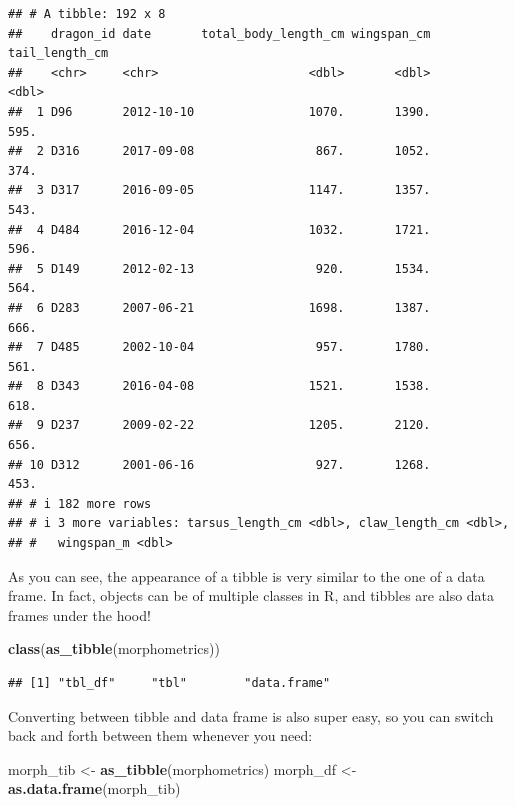 \documentclass[
]{book}
\newenvironment{Shaded}{\begin{snugshade}}{\end{snugshade}}
\newcommand{\FunctionTok}[1]{\textcolor[rgb]{0.13,0.29,0.53}{\textbf{#1}}}
\newcommand{\NormalTok}[1]{#1}
\newcommand{\OtherTok}[1]{\textcolor[rgb]{0.56,0.35,0.01}{#1}}
\begin{document}
\begin{verbatim}
## # A tibble: 192 x 8
##    dragon_id date       total_body_length_cm wingspan_cm tail_length_cm
##    <chr>     <chr>                     <dbl>       <dbl>          <dbl>
##  1 D96       2012-10-10                1070.       1390.           595.
##  2 D316      2017-09-08                 867.       1052.           374.
##  3 D317      2016-09-05                1147.       1357.           543.
##  4 D484      2016-12-04                1032.       1721.           596.
##  5 D149      2012-02-13                 920.       1534.           564.
##  6 D283      2007-06-21                1698.       1387.           666.
##  7 D485      2002-10-04                 957.       1780.           561.
##  8 D343      2016-04-08                1521.       1538.           618.
##  9 D237      2009-02-22                1205.       2120.           656.
## 10 D312      2001-06-16                 927.       1268.           453.
## # i 182 more rows
## # i 3 more variables: tarsus_length_cm <dbl>, claw_length_cm <dbl>,
## #   wingspan_m <dbl>
\end{verbatim}

As you can see, the appearance of a tibble is very similar to the one of a
data frame. In fact, objects can be of multiple classes in R, and tibbles are
also data frames under the hood!

\begin{Shaded}
\begin{Highlighting}[]
\FunctionTok{class}\NormalTok{(}\FunctionTok{as\_tibble}\NormalTok{(morphometrics))}
\end{Highlighting}
\end{Shaded}

\begin{verbatim}
## [1] "tbl_df"     "tbl"        "data.frame"
\end{verbatim}

Converting between tibble and data frame is also super easy, so you can switch
back and forth between them whenever you need:

\begin{Shaded}
\begin{Highlighting}[]
\NormalTok{morph\_tib }\OtherTok{\textless{}{-}} \FunctionTok{as\_tibble}\NormalTok{(morphometrics)}
\NormalTok{morph\_df }\OtherTok{\textless{}{-}} \FunctionTok{as.data.frame}\NormalTok{(morph\_tib)}
\end{Highlighting}
\end{Shaded}
\end{document}
